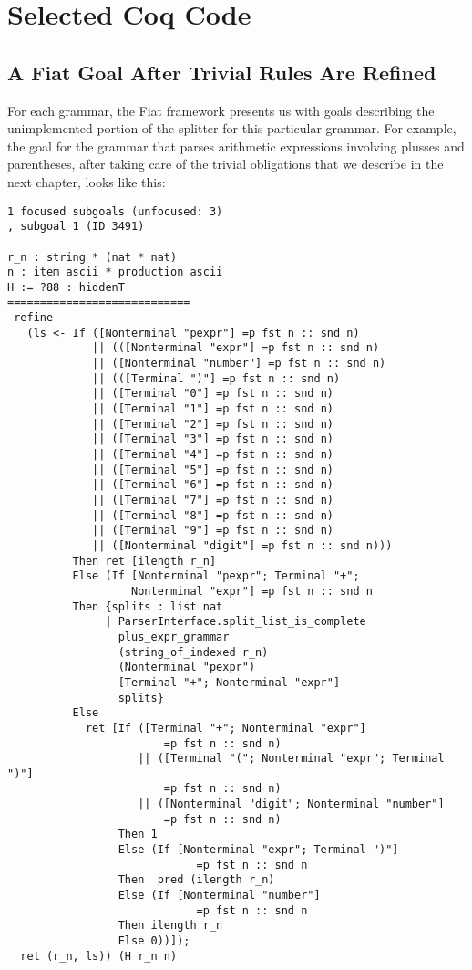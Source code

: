 \chapter{Selected Coq Code}
  \section{A Fiat Goal After Trivial Rules Are Refined}
      For each grammar, the Fiat framework presents us with goals describing the unimplemented portion of the splitter for this particular grammar.  For example, the goal for the grammar that parses arithmetic expressions involving plusses and parentheses, after taking care of the trivial obligations that we describe in the next chapter, looks like this:\label{sec:after-if-folding-num-+-paren}
\begin{verbatim}
1 focused subgoals (unfocused: 3)
, subgoal 1 (ID 3491)
  
r_n : string * (nat * nat)
n : item ascii * production ascii
H := ?88 : hiddenT
============================
 refine
   (ls <- If ([Nonterminal "pexpr"] =p fst n :: snd n)
             || (([Nonterminal "expr"] =p fst n :: snd n)
             || ([Nonterminal "number"] =p fst n :: snd n)
             || (([Terminal ")"] =p fst n :: snd n)
             || ([Terminal "0"] =p fst n :: snd n)
             || ([Terminal "1"] =p fst n :: snd n)
             || ([Terminal "2"] =p fst n :: snd n)
             || ([Terminal "3"] =p fst n :: snd n)
             || ([Terminal "4"] =p fst n :: snd n)
             || ([Terminal "5"] =p fst n :: snd n)
             || ([Terminal "6"] =p fst n :: snd n)
             || ([Terminal "7"] =p fst n :: snd n)
             || ([Terminal "8"] =p fst n :: snd n)
             || ([Terminal "9"] =p fst n :: snd n)
             || ([Nonterminal "digit"] =p fst n :: snd n)))
          Then ret [ilength r_n]
          Else (If [Nonterminal "pexpr"; Terminal "+";
                   Nonterminal "expr"] =p fst n :: snd n
          Then {splits : list nat
               | ParserInterface.split_list_is_complete
                 plus_expr_grammar
                 (string_of_indexed r_n)
                 (Nonterminal "pexpr")
                 [Terminal "+"; Nonterminal "expr"]
                 splits}
          Else
            ret [If ([Terminal "+"; Nonterminal "expr"]
                        =p fst n :: snd n)
                    || ([Terminal "("; Nonterminal "expr"; Terminal ")"]
                        =p fst n :: snd n)
                    || ([Nonterminal "digit"; Nonterminal "number"]
                        =p fst n :: snd n)
                 Then 1
                 Else (If [Nonterminal "expr"; Terminal ")"]
                             =p fst n :: snd n 
                 Then  pred (ilength r_n)
                 Else (If [Nonterminal "number"]
                             =p fst n :: snd n 
                 Then ilength r_n
                 Else 0))]);
  ret (r_n, ls)) (H r_n n)
\end{verbatim}

